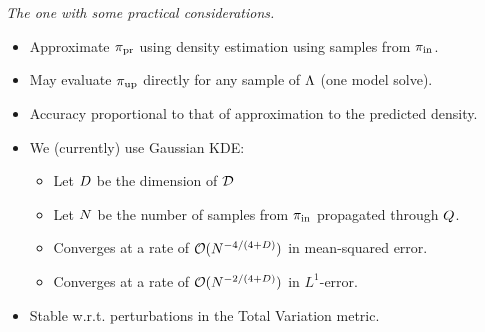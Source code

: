 \begin{frame}[t]{\it The one with some practical considerations.}

\begin{itemize}
	\item Approximate $\operatorname*{\pi_{pr}}$ using density estimation using samples from $\operatorname*{\pi_{in}}$.

  \bigskip
  \item May evaluate $\operatorname*{\pi_{up}}$ directly for any sample of ${\Lambda}$ (one model solve).

  \bigskip
  \item Accuracy proportional to that of approximation to the predicted density.

  \bigskip
  \item We (currently) use Gaussian KDE:
	\begin{itemize}
			\item Let $D$ be the dimension of $\mathcal{D}$
			\item Let $N$ be the number of samples from $\operatorname*{\pi_{in}}$ propagated through $Q$.
			\item Converges at a rate of $\mathcal{O}(N^{-4/(4+D)})$ in mean-squared error.
			\item Converges at a rate of $\mathcal{O}(N^{-2/(4+D)})$ in $L^1$-error.
	\end{itemize}

  \bigskip
  \item Stable w.r.t. perturbations in the Total Variation metric.
\end{itemize}

\end{frame}
